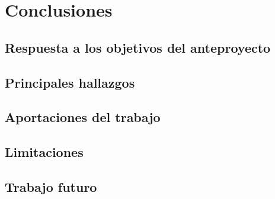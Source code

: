 \documentclass[12pt, a4paper, twoside]{article}
\begin{document}
	\newpage
	
	
	\section{Conclusiones}
	
	\subsection{Respuesta a los objetivos del anteproyecto}
	\subsection{Principales hallazgos}
	\subsection{Aportaciones del trabajo}
	\subsection{Limitaciones}
	\subsection{Trabajo futuro}
	
	
	\printbibliography
	
	
	
	
\end{document}
